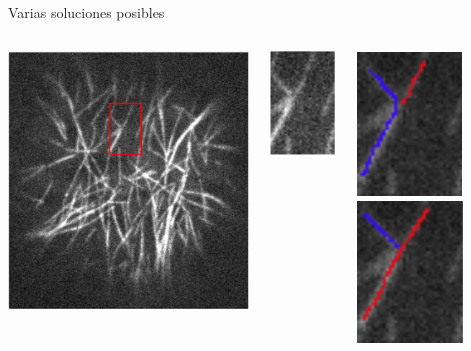 \documentclass[]{beamer}
\begin{document}
\begin{frame}{Varias soluciones posibles}
  \begin{columns}
    \begin{column}{0.6\textwidth}
    \includegraphics[scale=0.5]{Pictures/NoConsenso.png}
    \end{column}
    \begin{column}{0.2\textwidth}
    \includegraphics[scale=0.5]{Pictures/NoConsenso2.png}
    \end{column}
    \begin{column}{0.2\textwidth}
    \includegraphics[scale=0.5]{Pictures/NoConsenso3.png}
    \vspace{0.5cm}
    \includegraphics[scale=0.5]{Pictures/NoConsenso4.png}
    \end{column}
\end{columns}
\end{frame}
\end{document}
